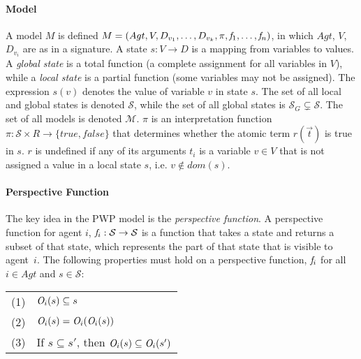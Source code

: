 \paragraph{Model}
A model $M$ is defined $M=(Agt, V, D_{v_1}, \ldots, D_{v_k},\pi,\mathit{f}_1,\dots,\mathit{f}_n)$, in which $Agt$, $V$, $D_{v_i}$ are as in a signature.
A state $s: V \rightarrow D$ is a mapping from variables to values. 
A \emph{global state} is a total function (a complete assignment for all variables in $V$), while a \emph{local state} is a partial function (some variables may not be assigned). 
The expression $s(v)$  denotes the value of variable $v$ in state $s$. 
The set of all local and global states is denoted $\mathcal{S}$, while the set of all global states is $\mathcal{S}_G \subsetneq \mathcal{S}$. 
The set of all models is denoted $\mathcal{M}$. 
$\pi$ is an interpretation function $\pi : \mathcal{S} \times R \rightarrow \{true,false\}$ that determines whether the atomic term $r(\Vec{t})$ is true in $s$. 
$r$ is undefined if any of its arguments $t_i$ is a variable $v\in V$ that is not assigned a value in a local state $s$, i.e. $v \not\in dom(s)$.


\paragraph{Perspective Function}
The key idea in the PWP model is the \emph{perspective function}.
A perspective function for agent $i$, $\mathit{f}_i: \mathcal{S} \rightarrow \mathcal{S}$ is a function that takes a state and returns a subset of that state, which represents the part of that state that is visible to agent~$i$. 
The following properties must hold on a perspective function, $\mathit{f}_i$ for all $i \in Agt$ and $s \in \mathcal{S}$:


\vspace{2mm}
\begin{tabular}{ll}
 (1) & $\mathit{O}_i(s) \subseteq s$ \\[1mm]
 (2) & $\mathit{O}_i(s) = \mathit{O}_i(\mathit{O}_i(s))$\\[1mm]
 (3) & If $s \subseteq s'$, then $\mathit{O}_i(s) \subseteq \mathit{O}_i(s')$
\end{tabular}
\vspace{2mm}




